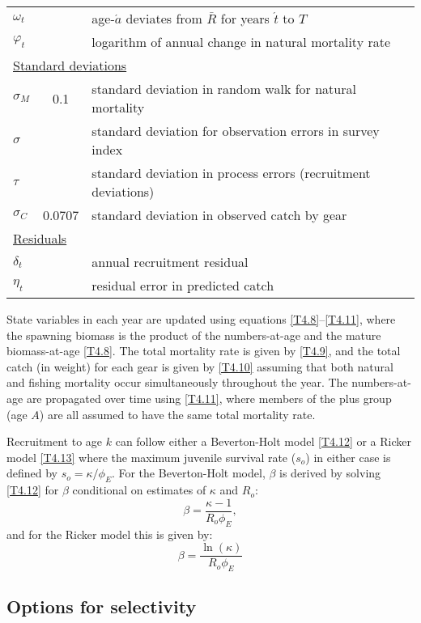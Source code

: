 \begin{table}[htdp]
\begin{center}
\begin{tabular}{lcl}
$\omega_t$&& age-$\acute{a}$ deviates from $\bar{R}$ for years $\acute{t}$ to $T$\\
$\varphi_t$&& logarithm of annual change in natural mortality rate\\
\multicolumn{3}{l}{\underline{Standard deviations}}\\
$\sigma_M$ &0.1& standard deviation in random walk for natural mortality\\
$\sigma$ && standard deviation for observation errors in survey index\\
$\tau$ && standard deviation in process errors (recruitment deviations)\\
$\sigma_C$& 0.0707 & standard deviation in observed catch by gear\\
\multicolumn{3}{l}{\underline{Residuals}}\\
$\delta_t$ && annual recruitment residual\\
$\eta_t$ && residual error in predicted catch\\
\hline \hline
\end{tabular}
\end{center}
\end{table}%


State variables in each year are updated using equations \ref{T4.8}--\ref{T4.11}, where the spawning biomass is the product of the numbers-at-age and the mature biomass-at-age \eqref{T4.8}.  The total mortality rate is given by \eqref{T4.9}, and the total catch (in weight) for each gear is given by \eqref{T4.10} assuming that both natural and fishing mortality occur simultaneously throughout the year.  The numbers-at-age are propagated over time using \eqref{T4.11}, where members of the plus group (age $A$) are all assumed to have the same total mortality rate.  

Recruitment to age $k$ can follow either a Beverton-Holt model \eqref{T4.12} or a Ricker model \eqref{T4.13} where the maximum juvenile survival rate ($s_o$) in either case is defined by $s_o=\kappa/\phi_E$.  For the Beverton-Holt model, $\beta$ is derived by solving \eqref{T4.12} for $\beta$ conditional on estimates of $\kappa$ and $R_o$:
\[
\beta = \frac{\kappa-1}{R_o \phi_E},
\]
and for the Ricker model this is given by:
\[
\beta = \frac{\ln(\kappa)}{R_o \phi_E}
\]


		
\subsection{Options for selectivity}\label{Appendix:SelectivityOptions}
		
